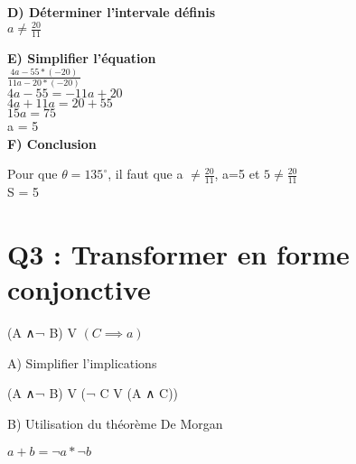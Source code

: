 \textbf{D) Déterminer l'intervale définis} \\

$a \neq \frac{20}{11}$
\vspace{5mm} %

\textbf{E) Simplifier l'équation} \\

$\frac{4a-55*(-20)}{11a-20*(-20)}$ \\

$4a-55 = -11a+20$ \\

$4a+11a = 20+55$ \\

$15a = 75$ \\

a = 5 \\

\textbf{F) Conclusion} \\
\vspace{2mm} %

Pour que $\theta = 135^{\circ}$, il faut que a $\neq \frac{20}{11}$, a=5 et $5 \neq \frac{20}{11}$ \\

S = 5

\newpage

\vspace{10mm} %

\section{Q3 : Transformer en forme conjonctive}

\vspace{4mm} %

(A ∧¬ B) V $(C\implies a)$ \\

\begin{flushleft}
A) Simplifier l’implications \\
\end{flushleft}

  (A ∧¬ B) V (¬ C V (A ∧ C))\\

\begin{flushleft}
B) Utilisation du théorème De Morgan \\
\end{flushleft}

  $a+b = ¬ a * ¬ b$\\

